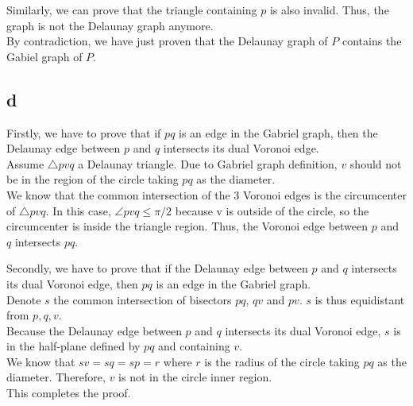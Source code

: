 Similarly, we can prove that the triangle containing $p$ is also invalid. Thus, the graph is not the Delaunay graph anymore. \\

By contradiction, we have just proven that the Delaunay graph of $P$ contains the Gabiel graph of $P$.

\subsection*{d}

Firstly, we have to prove that if $pq$ is an edge in the Gabriel graph, then the Delaunay edge between $p$ and $q$ intersects its dual Voronoi edge.\\

Assume $\bigtriangleup pvq$ a Delaunay triangle. Due to Gabriel graph definition, $v$ should not be in the region of the circle taking $pq$ as the diameter.\\

We know that the common intersection of the 3 Voronoi edges is the circumcenter of $\bigtriangleup pvq$. In this case, $\angle pvq \leq \pi / 2$ because v is outside of the circle, so the circumcenter is inside the triangle region. Thus, the Voronoi edge between $p$ and $q$ intersects $pq$.

Secondly, we have to prove that if the Delaunay edge between $p$ and $q$ intersects its dual Voronoi edge, then $pq$ is an edge in the Gabriel graph. \\

Denote $s$ the common intersection of bisectors $pq$, $qv$ and $pv$. $s$ is thus equidistant from $p, q, v$. \\

Because the Delaunay edge between $p$ and $q$ intersects its dual Voronoi edge, $s$ is in the half-plane defined by $pq$ and containing $v$. \\

We know that $sv = sq = sp = r$ where $r$ is the radius of the circle taking $pq$ as the diameter. Therefore, $v$ is not in the circle inner region.\\

This completes the proof.
